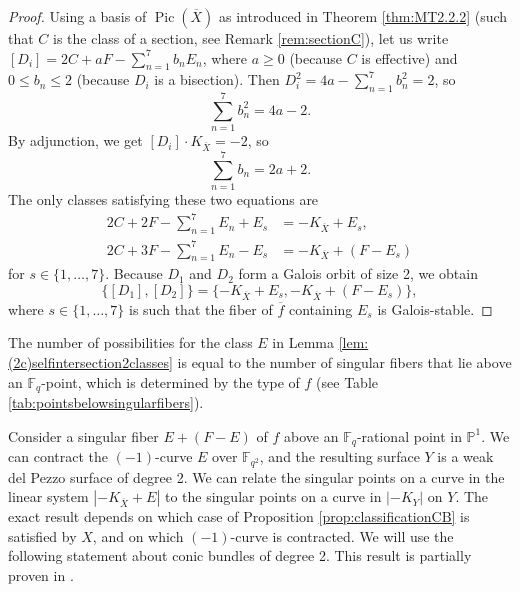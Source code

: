 \documentclass[a4paper, 11pt, reqno]{amsart}
\numberwithin{equation}{section} \numberwithin{figure}{section}
\DeclareMathOperator{\Pic}{Pic}
\def \F {{\mathbb F}}
\def \P {{\mathbb P}}
\theoremstyle{definition}
\numberwithin{lemma}{section}
\begin{document}
\begin{proof}
    Using a basis of $\Pic(\overline{X})$ as introduced in Theorem \ref{thm:MT2.2.2} (such that $C$ is the class of a section, see Remark \ref{rem:sectionC}), let us write $[D_i] = 2C + aF - \sum_{n=1}^7 b_n E_n$, where $a \geq 0$ (because $C$ is effective) and $0 \leq b_n \leq 2$ (because $D_i$ is a bisection). Then $D_i^2 = 4a - \sum_{n=1}^7 b_n^2 = 2$, so \[\sum_{n=1}^7 b_n^2 = 4a - 2.\] By adjunction, we get $[D_i] \cdot K_{\overline{X}} = -2$, so \[\sum_{n=1}^7 b_n = 2a + 2.\] The only classes satisfying these two equations are
\begin{align*}
    2C + 2F - \sum_{n=1}^7 E_n + E_s &= -K_{\overline{X}} + E_s,\\
    2C + 3F - \sum_{n=1}^7 E_n - E_s &= -K_{\overline{X}} +(F - E_s)
\end{align*}
for $s \in \{1, \ldots, 7\}$. Because $D_1$ and $D_2$ form a Galois orbit of size 2, we obtain \[\{[D_1], [D_2]\} = \{-K_{\overline{X}} + E_s, -K_{\overline{X}} + (F - E_s)\},\] where $s \in \{1, \ldots, 7\}$ is such that the fiber of $\overline{f}$ containing $E_s$ is Galois-stable.
\end{proof}

The number of possibilities for the class $E$ in Lemma \ref{lem:(2c)selfintersection2classes} is equal to the number of singular fibers that lie above an $\F_q$-point, which is determined by the type of $f$ (see Table \ref{tab:pointsbelowsingularfibers}).

Consider a singular fiber $E + (F-E)$ of $f$ above an $\F_q$-rational point in $\P^1$. We can contract the $(-1)$-curve $E$ over $\F_{q^2}$, and the resulting surface $Y$ is a weak del Pezzo surface of degree 2. We can relate the singular points on a curve in the linear system $|-K_{\overline{X}} + E|$ to the singular points on a curve in $|-K_Y|$ on $Y$. The exact result depends on which case of Proposition \ref{prop:classificationCB} is satisfied by $X$, and on which $(-1)$-curve is contracted. We will use the following statement about conic bundles of degree 2. This result is partially proven in \cite[Proposition 2.10]{trepalindeg2}. 
\end{document}
